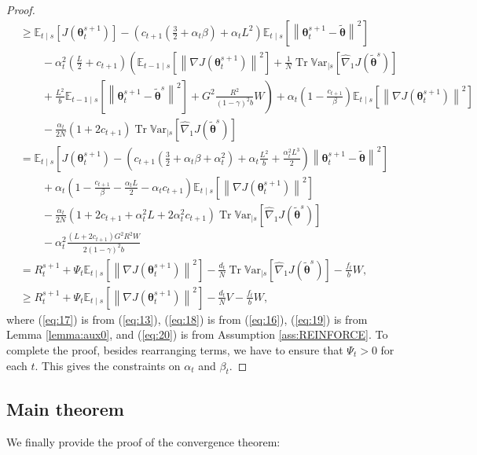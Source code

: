 \documentclass{article}
\theoremstyle{remark}
\theoremstyle{definition}
\DeclareMathOperator{\Tr}{Tr}
\newcommand{\norm}[2][\infty]{\left\|#2\right\|_{#1}}
\newcommand{\vtheta}{\boldsymbol{\theta}}
\newcommand{\gradJ}[1]{\nabla J(#1)}
\newcommand{\gradApp}[2]{\widehat{\nabla}_{#2}J(#1)}
\newcommand{\Ets}[2][t]{\mathbb{E}_{#1\mid s}\left[#2\right]}
\newcommand{\Varts}[2][t]{{\mathbb{V}\text{ar}}_{#1\mid s}\left[#2\right]}
\newcommand{\VARRF}{V}
\newcommand{\VARIS}{W}
\begin{document}
\begin{proof}
\begin{align}
	&\geq  \Ets{J(\vtheta_t^{s+1})} - \left(c_{t+1}\left(\frac{3}{2}+\alpha_t\beta\right)+\alpha_tL^2\right)\Ets{\norm[]{\vtheta_{t}^{s+1}-\tilde{\vtheta}}^2} \nonumber\\
	&\qquad
	-\alpha_t^2\left(\frac{L}{2}+c_{t+1}\right)\left(\Ets[t-1]{\norm[]{\gradJ{\vtheta_t^{s+1}}}^2} 
	+\frac{1}{N}\Tr\Varts[]{\gradApp{\tilde{\vtheta}^s}{1}}
	\right.\nonumber\\
	&\left.\qquad+\frac{L^2}{b}\Ets[t-1]{\norm[]{\vtheta_t^{s+1}-\tilde{\vtheta}^s}^2}
	+G^2\frac{R^2}{(1-\gamma)^2b}W\right)
	+\alpha_t\left(1-\frac{c_{t+1}}{\beta}\right)\Ets{\norm[]{\gradJ{\vtheta_t^{s+1}}}^2} \nonumber\\
	&\qquad-\frac{\alpha_t}{2N}\left(1+2c_{t+1}\right)\Tr\Varts[]{\gradApp{\tilde{\vtheta}^s}{1}} \label{eq:19}\\
	& = \Ets{J(\vtheta_t^{s+1}) - \left(c_{t+1}\left(\frac{3}{2}+\alpha_t\beta+\alpha_t^2\right)+\alpha_t\frac{L^2}{b}+\frac{\alpha_t^2L^3}{2}\right)\norm[]{\vtheta_{t}^{s+1}-\tilde{\vtheta}}^2} \nonumber\\
	&\qquad
	+\alpha_t\left(1-\frac{c_{t+1}}{\beta}-\frac{\alpha_tL}{2}-\alpha_tc_{t+1}\right)\Ets{\norm[]{\gradJ{\vtheta_t^{s+1}}}^2} \nonumber\\
	&\qquad-\frac{\alpha_t}{2N}\left(1+2c_{t+1}+\alpha_t^2L+2\alpha_t^2c_{t+1}\right)\Tr\Varts[]{\gradApp{\tilde{\vtheta}^s}{1}} \nonumber\\
	&\qquad-\alpha_t^2\frac{(L+2c_{t+1})G^2R^2\VARIS}{2(1-\gamma)^2b} \nonumber\\
	&= R_t^{s+1}
	+\Psi_t\Ets{\norm[]{\gradJ{\vtheta_t^{s+1}}}^2}
	-\frac{d_t}{N}\Tr\Varts[]{\gradApp{\tilde{\vtheta}^s}{1}}
	-\frac{f_t}{b}\VARIS,\nonumber\\
	&\geq R_t^{s+1}
	+\Psi_t\Ets{\norm[]{\gradJ{\vtheta_t^{s+1}}}^2}
	-\frac{d_t}{N}\VARRF
	-\frac{f_t}{b}\VARIS, \label{eq:20}
\end{align}
where (\ref{eq:17}) is from (\ref{eq:13}), (\ref{eq:18}) is from (\ref{eq:16}), (\ref{eq:19}) is from Lemma \ref{lemma:aux0}, and (\ref{eq:20}) is from Assumption \ref{ass:REINFORCE}.
To complete the proof, besides rearranging terms, we have to ensure that $\Psi_t>0$ for each $t$. This gives the constraints on $\alpha_t$ and $\beta_t$.
\end{proof}


\subsection*{Main theorem}
We finally provide the proof of the convergence theorem:
\end{document}
